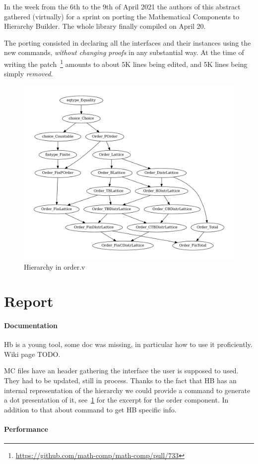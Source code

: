 \documentclass{easychair}
\begin{document}
In the week from the 6th to the 9th of April 2021 the authors of this abstract
gathered (virtually) for a sprint on porting the Mathematical Components to
Hierarchy Builder. The whole library finally compiled on April 20.

The porting consisted in declaring all the interfaces and their instances
using the new commands, \emph{without changing proofs} in any substantial way.
At the time of writing the patch~\footnote{\url{https://github.com/math-comp/math-comp/pull/733}}
amounts to about 5K lines being edited, and 5K lines being simply \emph{removed}.\\
\begin{figure}
  \vspace{-3.5em}
	\includegraphics[width=.45\textwidth]{order.pdf}
  \caption{Hierarchy in order.v}
	\label{fig:order}
\end{figure}

\section{Report}

\paragraph{Documentation}

Hb is a young tool, some doc was missing, in particular how to use it
proficiently. Wiki page TODO.

MC files have an header gathering the interface the user is supposed to used.
They had to be updated, still in process. Thanks to the fact that HB has an
internal representation of the hierarchy we could provide a command to
generate a dot presentation of it, see~\ref{fig:order} for the excerpt for the
order component. In addition to that about command to get HB
specific info.

\paragraph{Performance}
\end{document}
